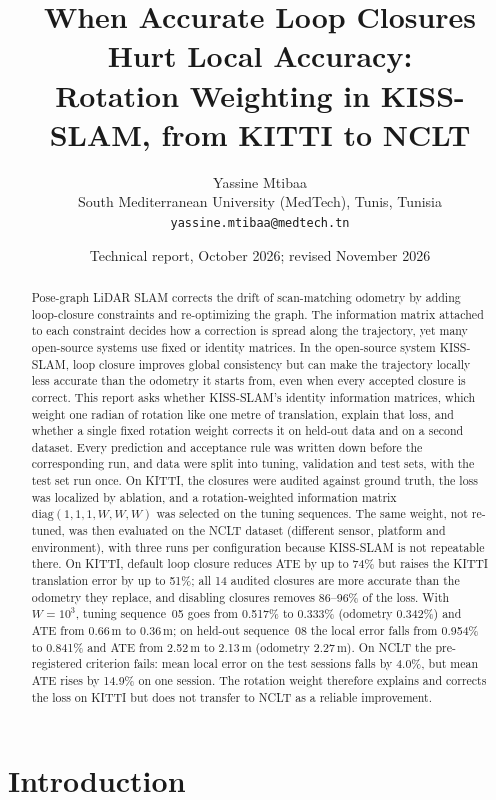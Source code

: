 \documentclass[11pt,a4paper]{article}
\title{When Accurate Loop Closures Hurt Local Accuracy:\\
Rotation Weighting in KISS-SLAM, from KITTI to NCLT}
\author{Yassine Mtibaa\\
South Mediterranean University (MedTech), Tunis, Tunisia\\
\texttt{yassine.mtibaa@medtech.tn}}
\date{Technical report, October 2026; revised November 2026}
\begin{document}
\maketitle

\begin{abstract}
Pose-graph LiDAR SLAM corrects the drift of scan-matching odometry by adding loop-closure constraints and
re-optimizing the graph. The information matrix attached to each constraint decides how a correction is spread
along the trajectory, yet many open-source systems use fixed or identity matrices.
In the open-source system KISS-SLAM, loop closure improves global consistency but can make the trajectory
locally less accurate than the odometry it starts from, even when every accepted closure is correct. This report
asks whether KISS-SLAM's identity information matrices, which weight one radian of rotation like one metre of
translation, explain that loss, and whether a single fixed rotation weight corrects it on held-out data and on a
second dataset.
Every prediction and acceptance rule was written down before the corresponding run, and data were split into
tuning, validation and test sets, with the test set run once. On KITTI, the closures were audited against ground
truth, the loss was localized by ablation, and a rotation-weighted information matrix
$\mathrm{diag}(1,1,1,W,W,W)$ was selected on the tuning sequences. The same weight, not re-tuned, was then
evaluated on the NCLT dataset (different sensor, platform and environment), with three runs per configuration
because KISS-SLAM is not repeatable there.
On KITTI, default loop closure reduces ATE by up to 74\% but raises the KITTI translation error by up to 51\%;
all 14 audited closures are more accurate than the odometry they replace, and disabling closures removes
86--96\% of the loss. With $W=10^3$, tuning sequence~05 goes from 0.517\% to 0.333\% (odometry 0.342\%) and ATE
from 0.66\,m to 0.36\,m; on held-out sequence~08 the local error falls from 0.954\% to 0.841\% and ATE from
2.52\,m to 2.13\,m (odometry 2.27\,m). On NCLT the pre-registered criterion fails: mean local error on the test
sessions falls by 4.0\%, but mean ATE rises by 14.9\% on one session. The rotation weight therefore explains
and corrects the loss on KITTI but does not transfer to NCLT as a reliable improvement.
\end{abstract}

\section{Introduction}
\end{document}
